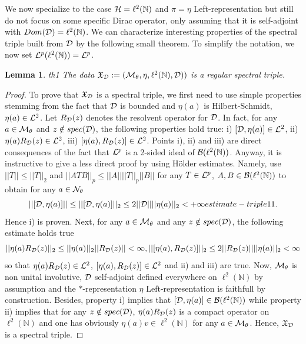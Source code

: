 \documentclass[10pt]{book}
\theoremstyle{break}
\newtheorem{lemma}{Lemma}
\begin{document}
We now specialize to the case ${\cal{H}}=\ell^2(\mathbb{N})$ and $\pi=\eta$ {Left-representation} but still do not focus on some specific Dirac operator, only assuming that it is self-adjoint with $Dom({\cal{D}})=\ell^2(\mathbb{N})$. We can characterize interesting properties of the spectral triple built from ${\cal{D}}$ by the following small theorem. To simplify the notation, we now set 
${\cal{L}}^p(\ell^2(\mathbb{N}))={\cal{L}}^p$.
\begin{lemma}{th1}
The data $\mathfrak{X}_{{\cal{D}}}:=({\cal{M}}_\theta,\eta,\ell^2(\mathbb{N}), {\cal{D}}))$ is a regular spectral triple.
\end{lemma}
\begin{proof}
To prove that $\mathfrak{X}_{{\cal{D}}}$ is a spectral triple, we first need to use simple properties stemming from the fact that ${\cal{D}}$ is bounded and $\eta(a)$ is Hilbert-Schmidt, $\eta(a)\in{\cal{L}}^2$. Let $R_{\cal{D}}(z)$ denotes the resolvent operator for ${\cal{D}}$. In fact, for any $a\in{\cal{M}}_\theta$ and $z\notin spec({\cal{D}})$, the following properties hold true: i) $[{\cal{D}},\eta(a)]\in{\cal{L}}^2$, ii) $\eta(a)R_{\cal{D}}(z)\in{\cal{L}}^2$, iii) $[\eta(a),R_{\cal{D}}(z)]\in{\cal{L}}^2$. Points i), ii) and iii) are direct consequences of the fact that ${\cal{L}}^p$ is a 2-sided ideal of ${\cal{B}}(\ell^2(\mathbb{N}))$. Anyway, it is instructive to give a less direct proof by using H\"older estimates. Namely, use $||T||\le||T||_2$ and $||ATB||_p\le||A||||T||_p||B||$ for any $T\in{\cal{L}}^p$, $A,B\in{\cal{B}}(\ell^2(\mathbb{N}))$ to obtain for any $a\in{\cal{N}}_\theta$
\begin{equation}
||[{\cal{D}},\eta(a)]||\le||[{\cal{D}},\eta(a)]||_2\le2||{\cal{D}}||||\eta(a)||_2<+\infty{estimate-triple11}.
\end{equation}
Hence i) is proven. Next, for any $a\in{\cal{M}}_\theta$ and any $z\notin spec({\cal{D}})$, the following estimate holds true
\begin{equation}
||\eta(a)R_{\cal{D}}(z)||_2\le||\eta(a)||_2||R_{\cal{D}}(z)||<\infty, ||[\eta(a),R_{\cal{D}}(z)]||_2\le2||R_{\cal{D}}(z)||||\eta(a)||_2<\infty
\end{equation}
so that $\eta(a)R_{{\cal{D}}}(z)\in{\cal{L}}^2$, $[\eta(a),R_{\cal{D}}(z)]\in{\cal{L}}^2$ and ii) and iii) are true.
Now, ${\cal{M}}_\theta$ is non unital involutive, ${\cal{D}}$ self-adjoint defined everywhere on $\ell^2(\mathbb{N})$ by assumption and the $*$-representation $\eta$ {Left-representation} is faithfull by construction. Besides, property i) implies that $[{\cal{D}},\eta(a)]\in{\cal{B}}(\ell^2(\mathbb{N}))$ while property ii) implies that for any $z\notin spec({\cal{D}})$, $\eta(a)R_{\cal{D}}(z)$ is a compact operator on $\ell^2(\mathbb{N})$ and one has obviously $\eta(a)v\in\ell^2(\mathbb{N})$ for any $a\in{\cal{M}}_\theta$. Hence, $\mathfrak{X}_{{\cal{D}}}$ is a spectral triple.

\end{proof}
\end{document}
